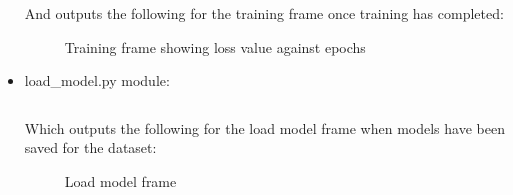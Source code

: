 \documentclass[./project-report/src/latex/project-report.tex]{subfiles}
\begin{document}
\begin{itemize}
        \pagebreak

        And outputs the following for the training frame once training has completed:

        \begin{figure}[h!]
        \centering
        \caption{Training frame showing loss value against epochs}
        \label{fig:training-frame-2-impl}
        \end{figure}

    \item load\_model.py module:
        \label{sec:load_model-module}
        \inputminted{python}{./school_project/frames/load_model.py}

        Which outputs the following for the load model frame when models have been saved for the dataset:

        \pagebreak

        \begin{figure}[h!]
        \centering
        \caption{Load model frame}
        \label{fig:load-model-frame-impl}
        \end{figure}


\end{itemize}
\end{document}

